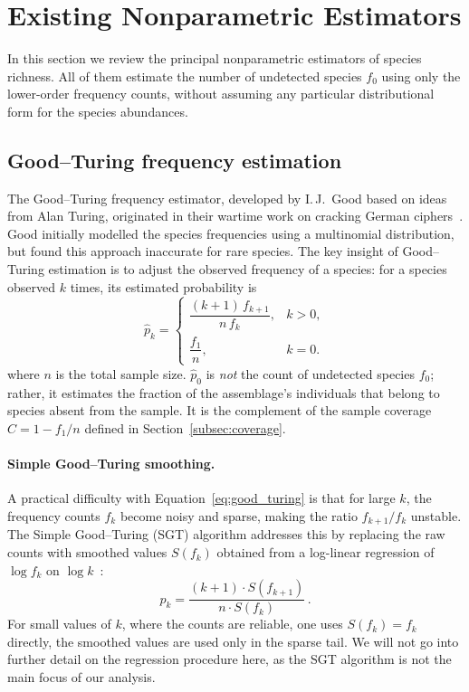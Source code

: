 \documentclass{article}
\begin{document}
\section{Existing Nonparametric Estimators}\label{sec:estimators}

In this section we review the principal nonparametric estimators of species richness. All of them estimate the number of undetected species $f_0$ using only the lower-order frequency counts, without assuming any particular distributional form for the species abundances.


\subsection{Good--Turing frequency estimation}

The Good--Turing frequency estimator, developed by I.\,J.\ Good based on ideas from Alan Turing, originated in their wartime work on cracking German ciphers~\cite{good1953,good2000}. Good initially modelled the species frequencies using a multinomial distribution, but found this approach inaccurate for rare species. The key insight of Good--Turing estimation is to adjust the observed frequency of a species: for a species observed $k$ times, its estimated probability is
\begin{equation}
    \label{eq:good_turing}
    \hat{p}_k =
    \begin{cases}   
        \dfrac{(k+1)\,f_{k+1}}{n\,f_k}, & k > 0, \\[6pt]
        \dfrac{f_1}{n}, & k = 0.
    \end{cases}
\end{equation}
where $n$ is the total sample size.
$\hat{p}_0$ is \emph{not} the count of undetected species $f_0$; rather, it estimates the fraction of the assemblage's individuals that belong to species absent from the sample. It is the complement of the sample coverage $\hat{C} = 1 - f_1/n$ defined in 
Section~\ref{subsec:coverage}.

\paragraph{Simple Good--Turing smoothing.}
A practical difficulty with Equation~\eqref{eq:good_turing} is that for large $k$, the frequency counts $f_k$ become noisy and sparse, making the ratio $f_{k+1}/f_k$ unstable. The Simple Good--Turing (SGT) algorithm addresses this by replacing the raw counts with smoothed values $S(f_k)$ obtained from a log-linear regression of $\log f_k$ on 
$\log k$~\cite{gale1995}:
\begin{equation}\label{eq:sgt}
    p_k = \frac{(k+1) \cdot S(f_{k+1})}{n \cdot S(f_k)}\,.
\end{equation}
For small values of $k$, where the counts are reliable, one uses $S(f_k) = f_k$ directly, the smoothed values are used only in the sparse tail. We will not go into further detail on the regression procedure here, as the SGT algorithm is not the main focus of our analysis.
\end{document}
